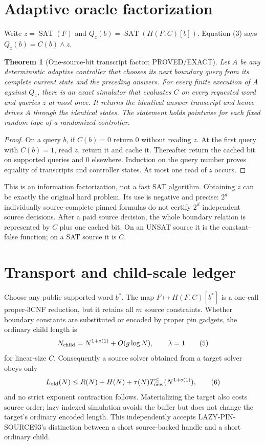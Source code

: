 \documentclass[11pt]{article}
\newtheorem{theorem}{Theorem}
\newcommand{\SAT}{\operatorname{SAT}}
\begin{document}
\section{Adaptive oracle factorization}
Write $z=\SAT(F)$ and $Q_z(b)=\SAT(H(F,C)[b])$.
Equation (3) says $Q_z(b)=C(b)\wedge z$.

\begin{theorem}[One-source-bit transcript factor; PROVED/EXACT]
Let $A$ be any deterministic adaptive controller that chooses its next
boundary query from its complete current state and the preceding answers.
For every finite execution of $A$ against $Q_z$, there is an exact simulator
that evaluates $C$ on every requested word and queries $z$ at most once.
It returns the identical answer transcript and hence drives $A$ through the
identical states.  The statement holds pointwise for each fixed random tape
of a randomized controller.
\end{theorem}
\begin{proof}
On a query $b$, if $C(b)=0$ return $0$ without reading $z$.  At the first
query with $C(b)=1$, read $z$, return it and cache it.  Thereafter return the
cached bit on supported queries and $0$ elsewhere.  Induction on the query
number proves equality of transcripts and controller states.  At most one
read of $z$ occurs.
\end{proof}

This is an information factorization, not a fast SAT algorithm.  Obtaining
$z$ can be exactly the original hard problem.  Its use is negative and
precise: $2^d$ individually source-complete pinned formulas do not certify
$2^d$ independent source decisions.  After a paid source decision, the
whole boundary relation is represented by $C$ plus one cached bit.  On an
UNSAT source it is the constant-false function; on a SAT source it is $C$.

\section{Transport and child-scale ledger}
Choose any public supported word $b^*$.  The map
$F\mapsto H(F,C)[b^*]$ is a one-call proper-3CNF reduction, but it retains
all $m$ source constraints.  Whether boundary constants are substituted or
encoded by proper pin gadgets, the ordinary child length is
\[
 N_{\rm child}=N^{1+o(1)}+O(g\log N),
 \qquad\lambda=1
 \tag{5}
\]
for linear-size $C$.  Consequently a source solver obtained from a target
solver obeys only
\[
 L_{\rm old}(N)\le R(N)+H(N)+\tau(N)
 T_{\rm new}^{\le}(N^{1+o(1)}),
 \tag{6}
\]
and no strict exponent contraction follows.  Materializing the target also
costs source order; lazy indexed simulation avoids the buffer but does not
change the target's ordinary encoded length.  This independently accepts
LAZY-PIN-SOURCE93's distinction between a short source-backed handle and a
short ordinary child.
\end{document}
